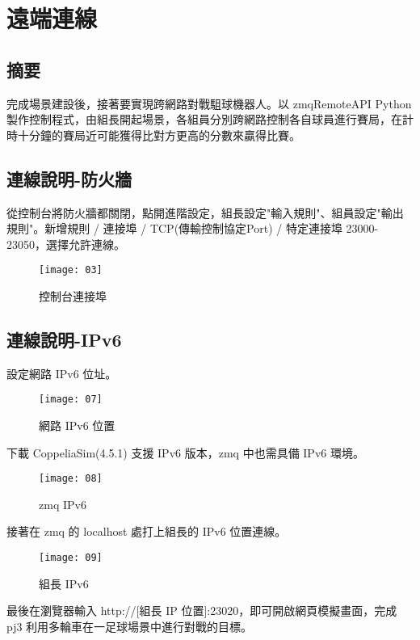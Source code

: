 \chapter{遠端連線}
\renewcommand{\baselinestretch}{10.0} %
\setcounter{page}{20}  %
\fontsize{14pt}{2.5pt}\sectionef
\section{摘要}
  完成場景建設後，接著要實現跨網路對戰駔球機器人。以 zmqRemoteAPI Python 製作控制程式，由組長開起場景，各組員分別跨網路控制各自球員進行賽局，在計時十分鐘的賽局近可能獲得比對方更高的分數來贏得比賽。\\
\section{連線說明-防火牆}
  從控制台將防火牆都關閉，點開進階設定，組長設定"輸入規則"、組員設定"輸出規則"。新增規則 / 連接埠 / TCP(傳輸控制協定Port) / 特定連接埠 23000-23050，選擇允許連線。\\
\begin{figure}[hbt!]
\begin{center}
\texttt{[image: 03]}
\caption{\Large 控制台連接埠}\label{fig.03}
\end{center}
\end{figure}
\section{連線說明-IPv6}
  設定網路 IPv6 位址。\\
\begin{figure}[hbt!]
\begin{center}
\texttt{[image: 07]}
\caption{\Large 網路 IPv6 位置}\label{fig.07}
\end{center}
\end{figure}

  下載 CoppeliaSim(4.5.1) 支援 IPv6 版本，zmq 中也需具備 IPv6 環境。\\
\begin{figure}[hbt!]
\begin{center}
\texttt{[image: 08]}
\caption{\Large zmq IPv6 }\label{fig.08}
\end{center}
\end{figure}

  接著在 zmq 的 localhost 處打上組長的 IPv6 位置連線。\\
\newpage
\begin{figure}[hbt!]
\begin{center}
\texttt{[image: 09]}
\caption{\Large 組長 IPv6 }\label{fig.09}
\end{center}
\end{figure}
  最後在瀏覽器輸入 http://[組長 IP 位置]:23020，即可開啟網頁模擬畫面，完成 pj3 利用多輪車在一足球場景中進行對戰的目標。